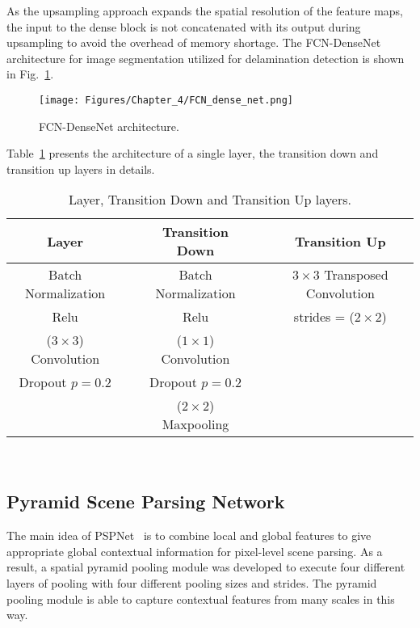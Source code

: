 As the upsampling approach expands the spatial resolution of the feature maps, the input to the dense block is not concatenated with its output during upsampling to avoid the overhead of memory shortage.
The FCN-DenseNet architecture for image segmentation utilized for delamination detection is shown in Fig.~\ref{fcn}.
\begin{figure} [h!]
	\begin{center}
		\texttt{[image: Figures/Chapter\_4/FCN\_dense\_net.png]}
	\end{center}
	\caption{FCN-DenseNet architecture.} 
	\label{fcn}
\end{figure}
Table~\ref{layers} presents the architecture of a single layer, the transition down and transition up layers in details.
\begin{table}[h!]
	\renewcommand{\arraystretch}{1.3}
	\centering
	\scriptsize
	\resizebox{\textwidth}{!}
	{
		\begin{tabular}{ccccc}
			\hline
			Layer & & Transition Down & & Transition Up \\ 
			\hline
			Batch Normalization & & Batch Normalization & & \(3\times 3\) Transposed Convolution \\ 
			Relu & & Relu & & strides = (\(2\times2\)) \\ 
			(\(3\times3\)) Convolution & & (\(1\times1\)) Convolution & & \\ 
			Dropout \(p=0.2\) & &Dropout \(p=0.2\) & & \\ 
			& & (\(2\times2\)) Maxpooling & & \\ 
			\hline
		\end{tabular}
	}
	\caption{Layer, Transition Down and Transition Up layers.} 
	\label{layers}	
\end{table}\\
\subsection{Pyramid Scene Parsing Network}
\label{sec435}
The main idea of PSPNet~\cite{zhao2017pyramid} is to combine local and global features to give appropriate global contextual information for pixel-level scene parsing.
As a result, a spatial pyramid pooling module was developed to execute four different layers of pooling with four different pooling sizes and strides.
The pyramid pooling module is able to capture contextual features from many scales in this way.

